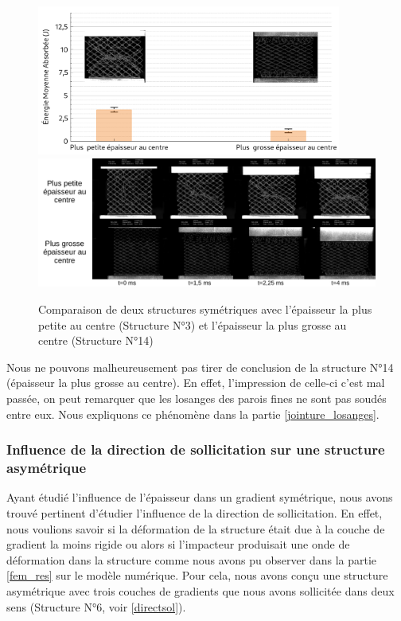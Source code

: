 \documentclass[a4paper]{article}
\begin{document}
	\begin{figure}[H]
		\centering
		\includegraphics[width=10cm]{Images/7/7_4/7_4_5/comp_pos_grad_sym.pdf}
		\includegraphics[width=16cm]{Images/7/7_4/7_4_5/instants.pdf}
		\caption{Comparaison de deux structures symétriques avec l'épaisseur la plus petite au centre (Structure N°3) et l'épaisseur la plus grosse au centre (Structure N°14)}
	\end{figure}

	Nous ne pouvons malheureusement pas tirer de conclusion de la structure N°14 (épaisseur la plus grosse au centre). En effet, l'impression de celle-ci c'est mal passée, on peut remarquer que les losanges des parois fines ne sont pas soudés entre eux. Nous expliquons ce phénomène dans la partie \ref{jointure_losanges}.
	\newpage
	
	\subsubsection{Influence de la direction de sollicitation sur une structure asymétrique}
	\hspace{0.5cm}Ayant étudié l'influence de l'épaisseur dans un gradient symétrique, nous avons trouvé pertinent d'étudier l'influence de la direction de sollicitation. En effet, nous voulions savoir si la déformation de la structure était due à la couche de gradient la moins rigide ou alors si l'impacteur produisait une onde de déformation dans la structure comme nous avons pu observer dans la partie \ref{fem_res} sur le modèle numérique. Pour cela, nous avons conçu une structure asymétrique avec trois couches de gradients que nous avons sollicitée dans deux sens (Structure N°6, voir \ref{directsol}).
	
\end{document}
